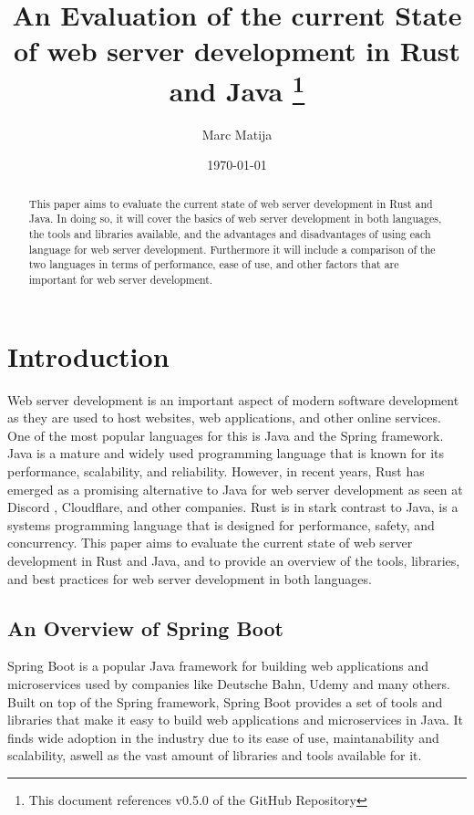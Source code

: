 \documentclass[a4paper,12pt]{article}
\title{An Evaluation of the current State of web server development in Rust and Java
\footnote{This document references v0.5.0 of the GitHub Repository}}
\author{Marc Matija}
\date{\today}
\begin{document}
	\maketitle
	\vspace{2cm}
	\begin{abstract}
		This paper aims to evaluate the current state of web server development in Rust and Java. 
		In doing so, it will cover the basics of web server development in both languages, the tools and libraries 
		available, and the advantages and disadvantages of using each language for web server development. 
		Furthermore it will include a comparison of the two languages in terms of performance, ease of 
		use, and other factors that are important for web server development. 
	\end{abstract}
	
	\newpage
	\tableofcontents
	\newpage
	
	\section{Introduction}
	\label{sec:introduction}
	Web server development is an important aspect of modern software development as they are 
	used to host websites, web applications, and other online services.
	One of the most popular languages for this is Java and the Spring framework.
	Java is a mature and widely used programming language that is known for its performance, scalability, and reliability.
	However, in recent years, Rust has emerged as a promising alternative to Java for web server development as seen at Discord 
	\cite{Discord}, Cloudflare\cite{Cloudflare_Pingora}, and other companies. 
	Rust is in stark contrast to Java, is a systems programming language that is designed for performance, safety, and concurrency.
	This paper aims to evaluate the current state of web server development in Rust and Java, and to provide an overview of 
	the tools, libraries, and best practices for web server development in both languages.
	
	\subsection{An Overview of Spring Boot}
	\label{subsec:spring_boot}
	Spring Boot is a popular Java framework for building web applications and microservices used by companies like 
	Deutsche Bahn\cite{DB_Job_Description}, Udemy \cite{Techstack_Udemy} and many others\cite{Spring_Boot_stackshare}.
	Built on top of the Spring framework, Spring Boot provides a set of tools and libraries that make it easy to build
	web applications and microservices in Java. It finds wide adoption in the industry due to its ease of use, maintanability 
	and scalability, aswell as the vast amount of libraries and tools available for it.
\end{document}
